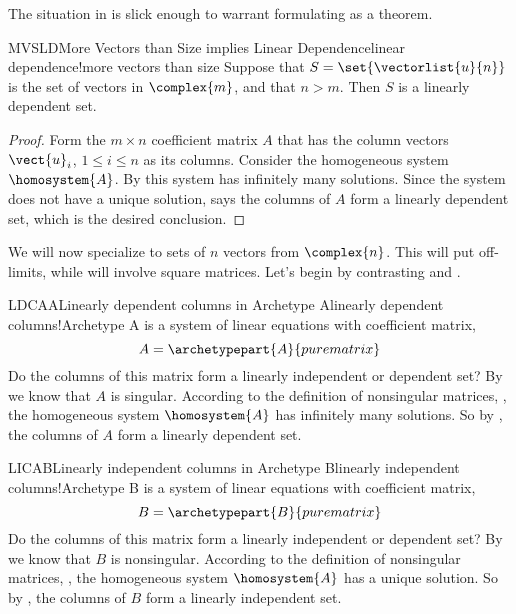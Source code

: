 %
The situation in  is slick enough to warrant formulating as a theorem.
%
\begin{theorem}{MVSLD}{More Vectors than Size implies Linear Dependence}{linear dependence!more vectors than size}
Suppose that $S=\set{\vectorlist{u}{n}}$ is the set of vectors in $\complex{m}$, and that $n>m$.   Then $S$ is a linearly dependent set.
\end{theorem}
%
\begin{proof}
Form the $m\times n$ coefficient matrix $A$ that has the column vectors $\vect{u}_i$, $1\leq i\leq n$ as its columns.  Consider the homogeneous system $\homosystem{A}$.  By  this system has infinitely many solutions.  Since the system does not have a unique solution,  says the columns of $A$ form a linearly dependent set, which is the desired conclusion.
\end{proof}
%
%
%
We will now specialize to sets of $n$ vectors from $\complex{n}$.  This will put  off-limits, while  will involve square matrices.  Let's begin by contrasting  and .
%
\begin{example}{LDCAA}{Linearly dependent columns in Archetype A}{linearly dependent columns!Archetype A}
 is a system of linear equations with coefficient matrix,
%
\begin{equation*}
A=
\archetypepart{A}{purematrix}
\end{equation*}
%
Do the columns of this matrix form a linearly independent or dependent set?  By  we know that $A$ is singular.  According to the definition of nonsingular matrices, , the homogeneous system $\homosystem{A}$ has infinitely many solutions.  So by , the columns of $A$ form a linearly dependent set.
%
\end{example}
%
\begin{example}{LICAB}{Linearly independent columns in Archetype B}{linearly independent columns!Archetype B}
 is a system of linear equations with coefficient matrix,
%
\begin{equation*}
B=
\archetypepart{B}{purematrix}
\end{equation*}
%
Do the columns of this matrix form a linearly independent or dependent set?  By  we know that $B$ is nonsingular.  According to the definition of nonsingular matrices, , the homogeneous system $\homosystem{A}$ has a unique solution.  So by , the columns of $B$ form a linearly independent set.
%
\end{example}

